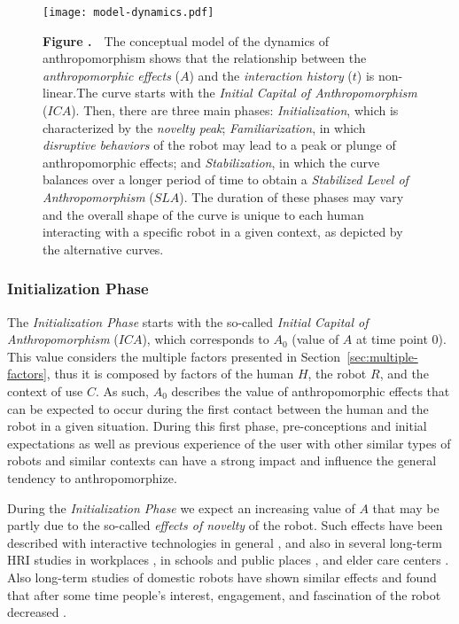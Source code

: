 \documentclass{frontiersSCNS} %
\begin{document}
\begin{figure}
\begin{center}
\texttt{[image: model-dynamics.pdf]}%
\end{center}
 \textbf{\label{fig:model-dynamics} Figure .}{~~\small The conceptual model of the dynamics of anthropomorphism shows that the relationship between the \textit{anthropomorphic effects} ($A$) and the \textit{interaction history} ($t$) is non-linear.The curve starts with the \textit{Initial Capital of Anthropomorphism} ($ICA$). Then, there are three main phases: \textit{Initialization}, which is characterized by the \textit{novelty peak}; \textit{Familiarization}, in which \textit{disruptive behaviors} of the robot may lead to a peak or plunge of anthropomorphic effects; and \textit{Stabilization}, in which the curve balances over a longer period of time to obtain a \textit{Stabilized Level of Anthropomorphism} ($SLA$). The duration of these phases may vary and the overall shape of the curve is unique to each human interacting with a specific robot in a given context, as depicted by the alternative curves.}
\end{figure}

\subsubsection{Initialization Phase\\}

The \textit{Initialization Phase} starts with the so-called \textit{Initial Capital of Anthropomorphism} ($ICA$), which corresponds to $A_0$ (value of $A$ at time point $0$). This value considers the multiple factors presented in Section~\ref{sec:multiple-factors}, thus it is composed by factors of the human $H$, the robot $R$, and the context of use $C$. As such, $A_0$ describes the value of anthropomorphic effects that can be expected to occur during the first contact between the human and the robot in a given situation. During this first phase, pre-conceptions and initial expectations as well as previous experience of the user with other similar types of robots and similar contexts can have a strong impact and influence the general tendency to anthropomorphize.

During the \textit{Initialization Phase} we expect an increasing value of $A$ that may be partly due to the so-called \textit{effects of novelty} of the robot. Such effects have been described with interactive technologies in general \citep{rogers_diffusion_1995}, and also in several long-term HRI studies in workplaces \citep{huttenrauch_fetch-and-carry_2003,mutlu_robots_2008}, in schools and public places \citep{gockley_designing_2005,kanda_communication_2005,kanda_interactive_2004}, and elder care centers \citep{sabelli_conversational_2011}. Also long-term studies of domestic robots have shown similar effects and found that after some time people's interest, engagement, and fascination of the robot decreased \citep{sung_robots_2009,sung_domestic_2010,fernaeus_how_2010,fink_living_2013}.
\end{document}
